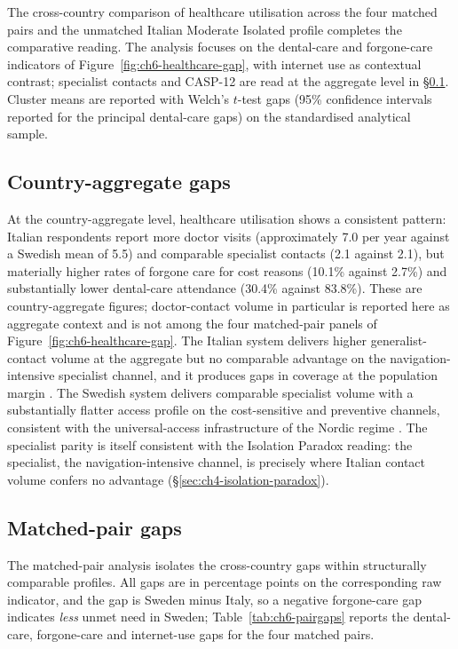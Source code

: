 The cross-country comparison of healthcare utilisation across the four matched pairs and the unmatched Italian Moderate Isolated profile completes the comparative reading. The analysis focuses on the dental-care and forgone-care indicators of Figure~\ref{fig:ch6-healthcare-gap}, with internet use as contextual contrast; specialist contacts and CASP-12 are read at the aggregate level in \S\ref{sec:ch6-aggregate-gaps}. Cluster means are reported with Welch's $t$-test gaps (95\% confidence intervals reported for the principal dental-care gaps) on the standardised analytical sample.

\subsection{Country-aggregate gaps}
\label{sec:ch6-aggregate-gaps}

At the country-aggregate level, healthcare utilisation shows a consistent pattern: Italian respondents report more doctor visits (approximately 7.0 per year against a Swedish mean of 5.5) and comparable specialist contacts (2.1 against 2.1), but materially higher rates of forgone care for cost reasons (10.1\% against 2.7\%) and substantially lower dental-care attendance (30.4\% against 83.8\%). These are country-aggregate figures; doctor-contact volume in particular is reported here as aggregate context and is not among the four matched-pair panels of Figure~\ref{fig:ch6-healthcare-gap}. The Italian system delivers higher generalist-contact volume at the aggregate but no comparable advantage on the navigation-intensive specialist channel, and it produces gaps in coverage at the population margin \citep{loscalzo2009}. The Swedish system delivers comparable specialist volume with a substantially flatter access profile on the cost-sensitive and preventive channels, consistent with the universal-access infrastructure of the Nordic regime \citep{anttonen1996}. The specialist parity is itself consistent with the Isolation Paradox reading: the specialist, the navigation-intensive channel, is precisely where Italian contact volume confers no advantage (\S\ref{sec:ch4-isolation-paradox}).

\subsection{Matched-pair gaps}
\label{sec:ch6-pair-gaps}

The matched-pair analysis isolates the cross-country gaps within structurally comparable profiles. All gaps are in percentage points on the corresponding raw indicator, and the gap is Sweden minus Italy, so a negative forgone-care gap indicates \emph{less} unmet need in Sweden; Table~\ref{tab:ch6-pairgaps} reports the dental-care, forgone-care and internet-use gaps for the four matched pairs.

